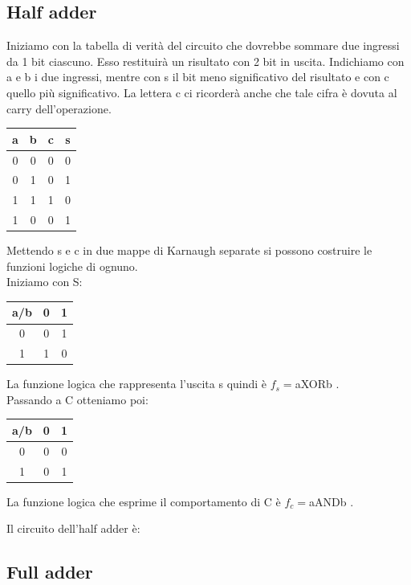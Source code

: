 \documentclass[a4paper]{book}
\begin{document}
\subsection{Half adder}
Iniziamo con la tabella di verità del circuito che dovrebbe sommare due ingressi da 1 bit ciascuno.
Esso restituirà un risultato con 2 bit in uscita.
Indichiamo con a e b i due ingressi, mentre con s il bit meno significativo del risultato e con c quello più significativo.
La lettera c ci ricorderà anche che tale cifra è dovuta al carry dell'operazione.
\\
\begin{tabular}{|c|c|c|c|}

\hline
a & b & c & s \\ \hline
0 & 0 & 0 & 0 \\ \hline
0 & 1 & 0 & 1 \\ \hline
1 & 1 & 1 & 0 \\ \hline
1 & 0 & 0 & 1 \\ 
\hline
\end{tabular}



Mettendo s e c in due mappe di Karnaugh separate si possono costruire le funzioni logiche di ognuno.\\
Iniziamo con S:

\begin{tabular}{|c|c|c|}
\hline
a/b & 0 & 1 \\ \hline
0   & 0 & \cellcolor{yellow}1 \\ \hline
1   & \cellcolor{yellow}1 & 0 \\ \hline
\end{tabular}

La funzione logica che rappresenta l'uscita s quindi è \(f_s=\)aXORb .\\
Passando a C otteniamo poi:

\begin{tabular}{|c|c|c|}
\hline
a/b & 0 & 1 \\ \hline
0   & 0 & 0 \\ \hline
1   & 0 & \cellcolor{yellow}1 \\ \hline
\end{tabular}

La funzione logica che esprime il comportamento di C è \(f_c=\)aANDb .

Il circuito dell'half adder è:


\subsection{Full adder}
\end{document}
